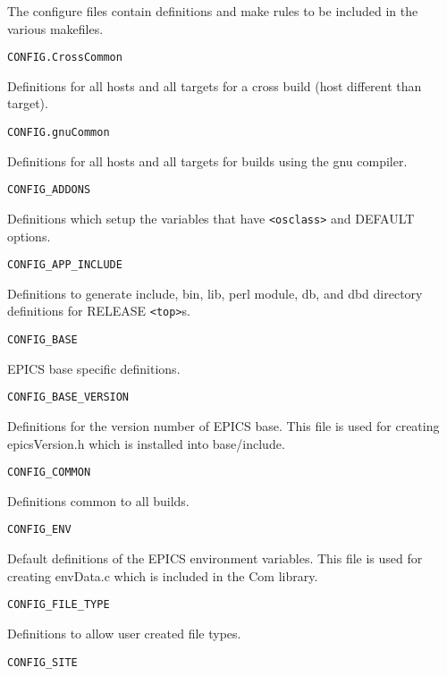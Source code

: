 The configure files contain definitions and make rules to be included in the various makefiles.

\begin{description}

\item {}\verb|CONFIG.CrossCommon|

Definitions for all hosts and all targets for a cross build (host different than target).

\item {}\verb|CONFIG.gnuCommon|

Definitions for all hosts and all targets for builds using the gnu compiler.

\item {}\verb|CONFIG_ADDONS|

Definitions which setup the variables that have \verb|<osclass>| and DEFAULT options.

\item {}\verb|CONFIG_APP_INCLUDE|

Definitions to generate include, bin, lib, perl module, db, and dbd directory definitions for RELEASE \verb|<top>|s.

\item {}\verb|CONFIG_BASE|

EPICS base specific definitions.

\item {}\verb|CONFIG_BASE_VERSION|

Definitions for the version number of EPICS base. This file is used for creating epicsVersion.h which is installed 
into base/include.

\item {}\verb|CONFIG_COMMON|

Definitions common to all builds.

\item {}\verb|CONFIG_ENV|

Default definitions of the EPICS environment variables. This file is used for creating envData.c which is included 
in the Com library.

\item {}\verb|CONFIG_FILE_TYPE|

Definitions to allow user created file types.

\item {}\verb|CONFIG_SITE|


\end{description}
